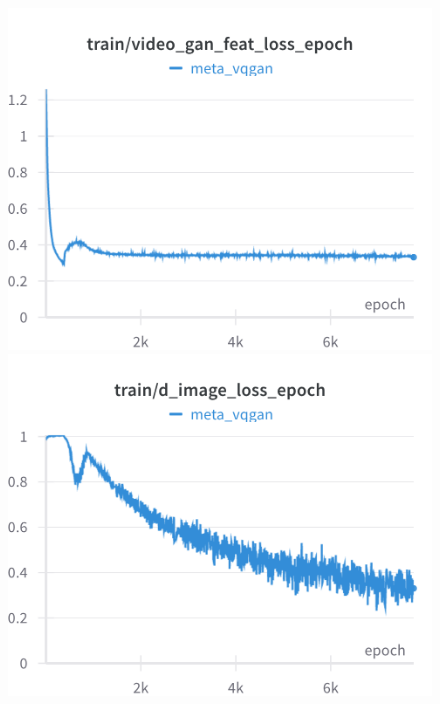 \begin{figure}[H]
\includegraphics[width=\linewidth]{detailed_engineering/Meta VQGAN/charts/Section-2-Panel-4-a7q9cb5bf}
\caption{}
\endminipage\hfill
{}
\includegraphics[width=\linewidth]{detailed_engineering/Meta VQGAN/charts/Section-2-Panel-5-nvxlurxvz}
\caption{}
\endminipage
\end{figure}

